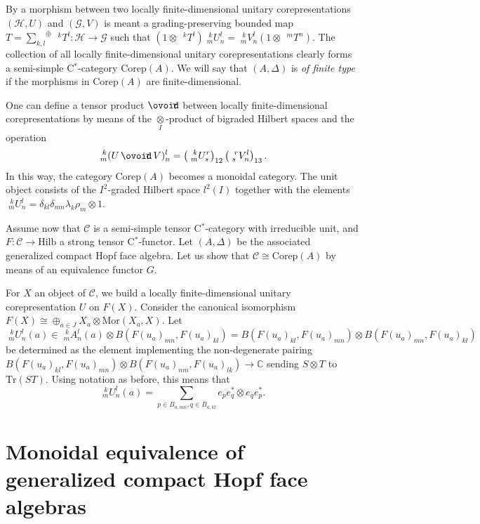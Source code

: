 \documentclass[12pt]{article}
\theoremstyle{change}
\newcommand{\C}{\mathbb{C}}
\newcommand{\Tr}{\mathrm{Tr}}
\newcommand{\CatC}{\mathcal{C}}
\newcommand{\Hilb}{\mathrm{Hilb}}
\newcommand{\Mor}{\mathrm{Mor}}
\newcommand{\Gr}[5]{\;{}^{\;#2}_{#4}#1_{#5}^{#3}}%
\newcommand{\Gru}[3]{\;{}^{\;#2}#1^{#3}}
\newcommand{\iitimes}{\underset{I}{\otimes}}
\newcommand{\osumc}[1]{\underset{#1}{\sum}^{\bar{\oplus}}}
\newcommand{\Circt}{\mathop{\ooalign{$\ovoid$\cr\hidewidth\raise-.05ex\hbox{$\scriptstyle\mathsf T\mkern3.5mu$}\cr}}} %
\newcommand{\CoRep}{\mathrm{Corep}}
\theoremstyle{definition}
\numberwithin{equation}{section}
\begin{document}
By a morphism between two locally finite-dimensional unitary corepresentations $(\mathscr{H},U)$ and $(\mathscr{G},V)$ is meant a grading-preserving bounded map $T = \osumc{k,l} \Gru{T}{k}{l}:\mathscr{H}\rightarrow \mathscr{G}$ such that $(1\otimes \Gru{T}{k}{l})\Gr{U}{k}{l}{m}{n} = \Gr{V}{k}{l}{m}{n}(1\otimes \Gru{T}{m}{n})$. The collection of all locally finite-dimensional unitary corepresentations clearly forms a semi-simple C$^*$-category $\CoRep(A)$. We will say that $(A,\Delta)$ is \emph{of finite type} if the morphisms in $\CoRep(A)$ are finite-dimensional.

One can define a tensor product $\Circt$ between locally finite-dimensional corepresentations by means of the $\iitimes$-product of bigraded Hilbert spaces and the operation
\[\Gr{(U\Circt V)}{k}{l}{m}{n} = \left(\Gr{U}{k}{r}{m}{s}\right)_{12}\left(\Gr{V}{r}{l}{s}{n}\right)_{13}.\] In this way, the category $\CoRep(A)$ becomes a monoidal category. The unit object consists of the $I^2$-graded Hilbert space $l^2(I)$ together with the elements $\Gr{U}{k}{l}{m}{n}= \delta_{kl}\delta_{mn}\lambda_k\rho_m\otimes 1$.

Assume now that $\CatC$ is a semi-simple tensor C$^*$-category with irreducible unit, and $F:\CatC\rightarrow \Hilb$ a strong tensor C$^*$-functor. Let $(A,\Delta)$ be the associated generalized compact Hopf face algebra. Let us show that $\CatC\cong \CoRep(A)$ by means of an equivalence functor $G$.

For $X$ an object of $\CatC$, we build a locally finite-dimensional unitary corepresentation $U$ on $F(X)$. Consider the canonical isomorphism $F(X) \cong \oplus_{a\in J} X_a \otimes \Mor(X_a,X)$. Let \[\Gr{U}{k}{l}{m}{n}(a) \in  \Gr{A}{k}{l}{m}{n}(a)\otimes B(F(u_a)_{mn},F(u_a)_{kl})= B(F(u_a)_{kl},F(u_a)_{mn})\otimes B(F(u_a)_{mn},F(u_a)_{kl})\] be determined as the element implementing the non-degenerate pairing $B(F(u_a)_{kl},F(u_a)_{mn})\otimes B(F(u_a)_{nm},F(u_a)_{lk})\rightarrow \C$ sending $S\otimes T$ to $\Tr(ST)$. Using notation as before, this means that \[\Gr{U}{k}{l}{m}{n}(a) = \sum_{p\in B_{a,mn},q\in B_{a,kl}} e_pe_q^*\otimes e_qe_p^*.\]



\section*{Monoidal equivalence of generalized compact Hopf face algebras}
\end{document}
